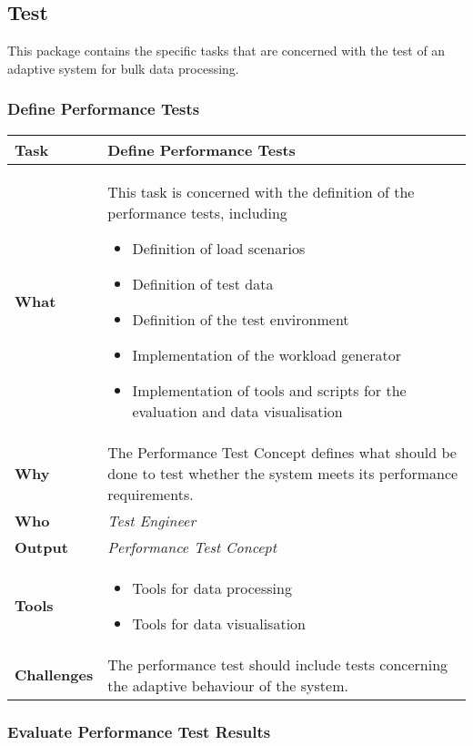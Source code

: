 \subsection{Test}
This package contains the specific tasks that are concerned with the test of an adaptive system for bulk data processing. 

\subsubsection{Define Performance Tests}
\begin{tabularx}{\textwidth}{@{} l X @{}}
	\caption{Define Performance Tests} \label{table:ch6_Task_Define_Performance_Tests}\\
	\toprule 
	\bfseries Task & Define Performance Tests\\
	\midrule 
	\bfseries What &
	This task is concerned with the definition of the performance tests, including
	\begin{itemize}
		\item Definition of load scenarios
		\item Definition of test data
		\item Definition of the test environment
		\item Implementation of the workload generator
		\item Implementation of tools and scripts for the evaluation and data visualisation
	\end{itemize}
	\\
	\midrule 
	\bfseries Why & The Performance Test Concept defines what should be done to test whether the system meets its performance requirements.\\
	\midrule 
	\bfseries Who & \emph{Test Engineer}\\
	\midrule 
	\bfseries Output & \emph{Performance Test Concept}\\
	\midrule
	\bfseries Tools & 
	\begin{itemize}
		\item Tools for data processing 
		\item Tools for data visualisation
	\end{itemize}\\
	\midrule
	\bfseries Challenges & The performance test should include tests concerning the adaptive behaviour of the system.\\
	\bottomrule 
\end{tabularx}

\subsubsection{Evaluate Performance Test Results}

